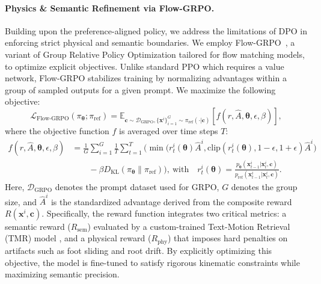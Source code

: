 \paragraph{Physics \& Semantic Refinement via Flow-GRPO.}
Building upon the preference-aligned policy, we address the limitations of DPO in enforcing strict physical and semantic boundaries.
We employ Flow-GRPO~\citep{Liu2025}, a variant of Group Relative Policy Optimization tailored for flow matching models, to optimize explicit objectives.
Unlike standard PPO which requires a value network, Flow-GRPO stabilizes training by normalizing advantages within a group of sampled outputs for a given prompt.
We maximize the following objective:
\begin{equation}
    \mathcal{L}_{\text{Flow-GRPO}}(\pi_{\bm{\theta}};\pi_{\text{ref}}) = \mathbb{E}_{\bm{c} \sim \mathcal{D}_\text{GRPO}, \{\bm{x}^i\}_{i=1}^G \sim \pi_{\text{ref}}(\cdot| \bm{c})} \left[ f(r,\hat{A},\bm{\theta}, \epsilon,\beta) \right],
\end{equation}
where the objective function $f$ is averaged over time steps $T$:
\begin{equation}
    \begin{aligned}
        f(r,\hat{A},\bm{\theta}, \epsilon,\beta) &= \frac{1}{G}\sum_{i=1}^G \frac{1}{T} \sum_{t=1}^T \Big( \min \big( r_t^i(\bm{\theta})\hat{A}^i, \text{clip}(r_t^i(\bm{\theta}), 1-\epsilon, 1+\epsilon)\hat{A}^i \big) \\
        & \qquad - \beta D_{\text{KL}}(\pi_{\bm{\theta}} \| \pi_{\text{ref}}) \Big), \
        \text{with}\quad r_t^i(\bm{\theta}) = \frac{p_{\bm{\theta}}(\bm{x}_{t-1}^i|\bm{x}_{t}^i,\bm{c})}{p_{\text{ref}}(\bm{x}_{t-1}^i|\bm{x}_{t}^i,\bm{c})}.
    \end{aligned}
\end{equation}
Here, $\mathcal{D}_\text{GRPO}$ denotes the prompt dataset used for GRPO, $G$ denotes the group size, and $\hat{A}^i$ is the standardized advantage derived from the composite reward $R(\bm{x}^i, \bm{c})$.
Specifically, the reward function integrates two critical metrics:
a semantic reward ($R_{\text{sem}}$)  evaluated by a custom-trained Text-Motion Retrieval (TMR) model \cite{petrovich2023tmr}, and a physical reward ($R_{\text{phy}}$) that imposes hard penalties on artifacts such as foot sliding and root drift.
By explicitly optimizing this objective, the model is fine-tuned to satisfy rigorous kinematic constraints while maximizing semantic precision.
